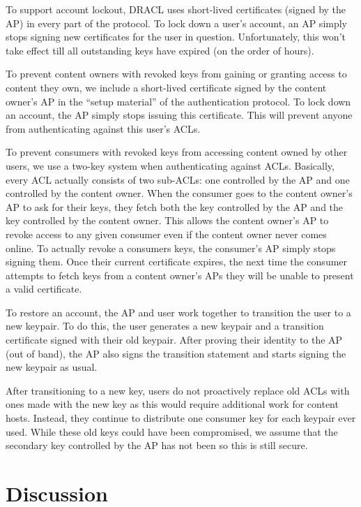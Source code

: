 \documentclass[pdftex,12pt,a4papaer]{report}
\begin{document}
To support account lockout, DRACL uses short-lived certificates (signed by the
AP) in every part of the protocol. To lock down a user's account, an AP simply
stops signing new certificates for the user in question. Unfortunately, this
won't take effect till all outstanding keys have expired (on the order of
hours).

To prevent content owners with revoked keys from gaining or granting access to
content they own, we include a short-lived certificate signed by the content
owner's AP in the ``setup material'' of the authentication protocol. To lock
down an account, the AP simply stops issuing this certificate. This will prevent
anyone from authenticating against this user's ACLs.

To prevent consumers with revoked keys from accessing content owned by other
users, we use a two-key system when authenticating against ACLs. Basically,
every ACL actually consists of two sub-ACLs: one controlled by the AP and one
controlled by the content owner. When the consumer goes to the content owner's
AP to ask for their keys, they fetch both the key controlled by the AP and the
key controlled by the content owner. This allows the content owner's AP to
revoke access to any given consumer even if the content owner never comes
online. To actually revoke a consumers keys, the consumer's AP simply stops
signing them. Once their current certificate expires, the next time the consumer
attempts to fetch keys from a content owner's APs they will be unable to present
a valid certificate.

To restore an account, the AP and user work together to transition the user to a
new keypair. To do this, the user generates a new keypair and a transition
certificate signed with their old keypair. After proving their identity to the
AP (out of band), the AP also signs the transition statement and starts signing
the new keypair as usual.

After transitioning to a new key, users do not proactively replace old ACLs with
ones made with the new key as this would require additional work for content
hosts. Instead, they continue to distribute one consumer key for each keypair
ever used. While these old keys could have been compromised, we assume that the
secondary key controlled by the AP has not been so this is still secure.

\chapter{Discussion}
\end{document}
